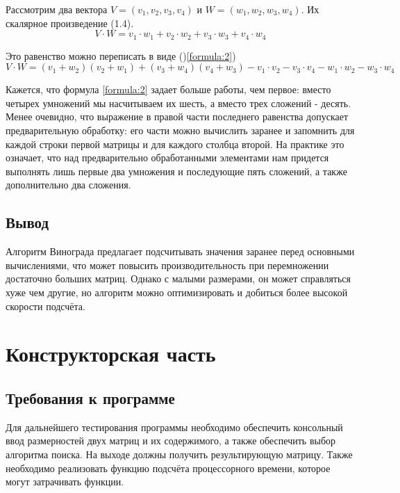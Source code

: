 \documentclass[12pt,a4paper]{report}
\begin{document}
Рассмотрим два вектора $V = (v_{1}, v_{2}, v_{3}, v_{4})$ и $W = (w_{1}, w_{2}, w_{3}, w_{4})$. Их 
скалярное произведение (1.4). 
\begin{equation}
    V \cdot W = v_{1} \cdot w_{1} + v_{2} \cdot w_{2} + v_{3} \cdot w_{3} + v_{4} \cdot w_{4}
    \label{formula:1}
\end{equation}

Это равенство можно переписать в виде ()\ref{formula:2})
\begin{equation}
    V \cdot W = (v_{1} + w_{2})(v_{2} + w_{1}) + (v_{3} + w_{4})(v_{4} + w_{3}) - v_{1} \cdot v_{2} - v_{3} \cdot v_{4} - w_{1} \cdot w_{2} - w_{3} \cdot w_{4}
    \label{formula:2}    
\end{equation}

Кажется, что формула \ref{formula:2} задает больше работы, чем первое: вместо четырех умножений мы насчитываем их 
шесть, а вместо трех сложений - десять.
Менее очевидно, что выражение в правой части последнего равенства допускает предварительную обработку: его 
части можно вычислить заранее и запомнить для каждой строки первой матрицы и для каждого столбца второй. 
На практике это означает, что над предварительно обработанными элементами нам придется выполнять лишь первые 
два умножения и последующие пять сложений, а также дополнительно два сложения.

\section{Вывод}

Алгоритм Винограда предлагает подсчитывать значения заранее перед основными вычислениями, что может повысить 
производительность при перемножении достаточно больших матриц. 
Однако с малыми размерами, он может справляться хуже чем другие, но алгоритм можно оптимизировать и добиться 
более высокой скорости подсчёта.

\newpage
\chapter{Конструкторская часть}

\section{Требования к программе}

Для дальнейшего тестирования программы необходимо обеспечить консольный ввод размерностей двух матриц 
и их содержимого, а также обеспечить выбор алгоритма поиска. На выходе должны получить результирующую 
матрицу. Также необходимо реализовать функцию подсчёта процессорного времени, которое могут затрачивать функции.
\end{document}
